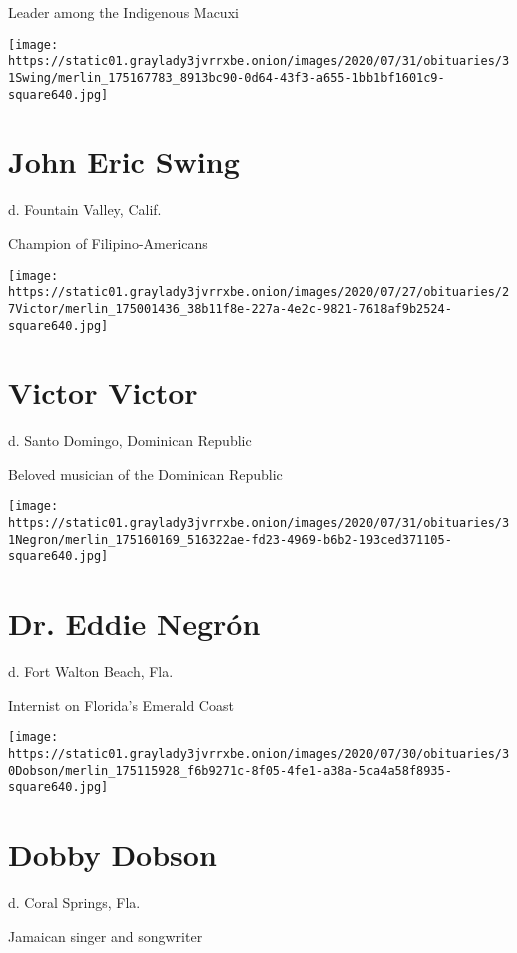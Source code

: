 Leader among the Indigenous Macuxi

\texttt{[image: https://static01.graylady3jvrrxbe.onion/images/2020/07/31/obituaries/31Swing/merlin\_175167783\_8913bc90-0d64-43f3-a655-1bb1bf1601c9-square640.jpg]}

\hypertarget{john-eric-swing}{%
\section{John Eric Swing}\label{john-eric-swing}}

d. Fountain Valley, Calif.

Champion of Filipino-Americans

\texttt{[image: https://static01.graylady3jvrrxbe.onion/images/2020/07/27/obituaries/27Victor/merlin\_175001436\_38b11f8e-227a-4e2c-9821-7618af9b2524-square640.jpg]}

\hypertarget{victor-victor}{%
\section{Victor Victor}\label{victor-victor}}

d. Santo Domingo, Dominican Republic

Beloved musician of the Dominican Republic

\texttt{[image: https://static01.graylady3jvrrxbe.onion/images/2020/07/31/obituaries/31Negron/merlin\_175160169\_516322ae-fd23-4969-b6b2-193ced371105-square640.jpg]}

\hypertarget{dr-eddie-negruxf3n}{%
\section{Dr. Eddie Negrón}\label{dr-eddie-negruxf3n}}

d. Fort Walton Beach, Fla.

Internist on Florida's Emerald Coast

\texttt{[image: https://static01.graylady3jvrrxbe.onion/images/2020/07/30/obituaries/30Dobson/merlin\_175115928\_f6b9271c-8f05-4fe1-a38a-5ca4a58f8935-square640.jpg]}

\hypertarget{dobby-dobson}{%
\section{Dobby Dobson}\label{dobby-dobson}}

d. Coral Springs, Fla.

Jamaican singer and songwriter

